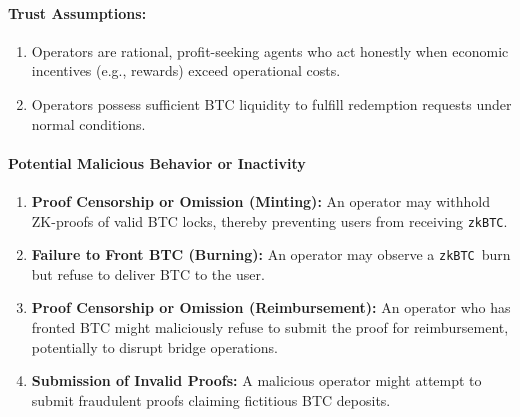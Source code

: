 \documentclass{DESSThesis}
\newcommand{\zktoken}{\texttt{zkBTC}}
\begin{document}
\paragraph{Trust Assumptions:}
    \begin{enumerate}
        \item Operators are rational, profit-seeking agents who act honestly when economic incentives (e.g., rewards) exceed operational costs.
        \item Operators possess sufficient BTC liquidity to fulfill redemption requests under normal conditions.
    \end{enumerate}



\paragraph{Potential Malicious Behavior or Inactivity}
    \begin{enumerate}
        \item \textbf{Proof Censorship or Omission (Minting):} An operator may withhold ZK-proofs of valid BTC locks, thereby preventing users from receiving \zktoken.
        \item \textbf{Failure to Front BTC (Burning):} An operator may observe a \zktoken\ burn but refuse to deliver BTC to the user.
        \item \textbf{Proof Censorship or Omission (Reimbursement):} An operator who has fronted BTC might maliciously refuse to submit the proof for reimbursement, potentially to disrupt bridge operations.
        \item \textbf{Submission of Invalid Proofs:} A malicious operator might attempt to submit fraudulent proofs claiming fictitious BTC deposits.
    \end{enumerate}
\end{document}
